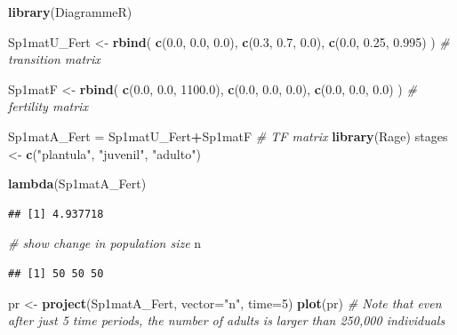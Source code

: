 \documentclass[
]{book}
\newenvironment{Shaded}{\begin{snugshade}}{\end{snugshade}}
\newcommand{\AttributeTok}[1]{\textcolor[rgb]{0.13,0.29,0.53}{#1}}
\newcommand{\CommentTok}[1]{\textcolor[rgb]{0.56,0.35,0.01}{\textit{#1}}}
\newcommand{\DecValTok}[1]{\textcolor[rgb]{0.00,0.00,0.81}{#1}}
\newcommand{\FloatTok}[1]{\textcolor[rgb]{0.00,0.00,0.81}{#1}}
\newcommand{\FunctionTok}[1]{\textcolor[rgb]{0.13,0.29,0.53}{\textbf{#1}}}
\newcommand{\NormalTok}[1]{#1}
\newcommand{\OtherTok}[1]{\textcolor[rgb]{0.56,0.35,0.01}{#1}}
\newcommand{\SpecialCharTok}[1]{\textcolor[rgb]{0.81,0.36,0.00}{\textbf{#1}}}
\newcommand{\StringTok}[1]{\textcolor[rgb]{0.31,0.60,0.02}{#1}}
\theoremstyle{definition}
\theoremstyle{definition}
\theoremstyle{definition}
\theoremstyle{definition}
\theoremstyle{remark}
\begin{document}
\begin{Shaded}
\begin{Highlighting}[]
\FunctionTok{library}\NormalTok{(DiagrammeR)}

\NormalTok{Sp1matU\_Fert }\OtherTok{\textless{}{-}} \FunctionTok{rbind}\NormalTok{(}
  \FunctionTok{c}\NormalTok{(}\FloatTok{0.0}\NormalTok{, }\FloatTok{0.0}\NormalTok{, }\FloatTok{0.0}\NormalTok{),}
  \FunctionTok{c}\NormalTok{(}\FloatTok{0.3}\NormalTok{, }\FloatTok{0.7}\NormalTok{, }\FloatTok{0.0}\NormalTok{),}
  \FunctionTok{c}\NormalTok{(}\FloatTok{0.0}\NormalTok{, }\FloatTok{0.25}\NormalTok{, }\FloatTok{0.995}\NormalTok{)}
\NormalTok{) }\CommentTok{\# transition matrix}

\NormalTok{Sp1matF }\OtherTok{\textless{}{-}} \FunctionTok{rbind}\NormalTok{(}
  \FunctionTok{c}\NormalTok{(}\FloatTok{0.0}\NormalTok{, }\FloatTok{0.0}\NormalTok{, }\FloatTok{1100.0}\NormalTok{),}
  \FunctionTok{c}\NormalTok{(}\FloatTok{0.0}\NormalTok{, }\FloatTok{0.0}\NormalTok{, }\FloatTok{0.0}\NormalTok{),}
  \FunctionTok{c}\NormalTok{(}\FloatTok{0.0}\NormalTok{, }\FloatTok{0.0}\NormalTok{, }\FloatTok{0.0}\NormalTok{)}
\NormalTok{) }\CommentTok{\# fertility matrix}

\NormalTok{Sp1matA\_Fert }\OtherTok{=}\NormalTok{ Sp1matU\_Fert}\SpecialCharTok{+}\NormalTok{Sp1matF }\CommentTok{\# TF matrix}
\FunctionTok{library}\NormalTok{(Rage)}
\NormalTok{stages }\OtherTok{\textless{}{-}} \FunctionTok{c}\NormalTok{(}\StringTok{"plantula"}\NormalTok{, }\StringTok{"juvenil"}\NormalTok{, }\StringTok{"adulto"}\NormalTok{)}

\FunctionTok{lambda}\NormalTok{(Sp1matA\_Fert)}
\end{Highlighting}
\end{Shaded}

\begin{verbatim}
## [1] 4.937718
\end{verbatim}

\begin{Shaded}
\begin{Highlighting}[]
\CommentTok{\# show change in population size}
\NormalTok{n}
\end{Highlighting}
\end{Shaded}

\begin{verbatim}
## [1] 50 50 50
\end{verbatim}

\begin{Shaded}
\begin{Highlighting}[]
\NormalTok{pr }\OtherTok{\textless{}{-}} \FunctionTok{project}\NormalTok{(Sp1matA\_Fert, }\AttributeTok{vector=}\StringTok{"n"}\NormalTok{, }\AttributeTok{time=}\DecValTok{5}\NormalTok{)}
\FunctionTok{plot}\NormalTok{(pr) }\CommentTok{\# Note that even after just 5 time periods, the number of adults is larger than 250,000 individuals}
\end{Highlighting}
\end{Shaded}
\end{document}
